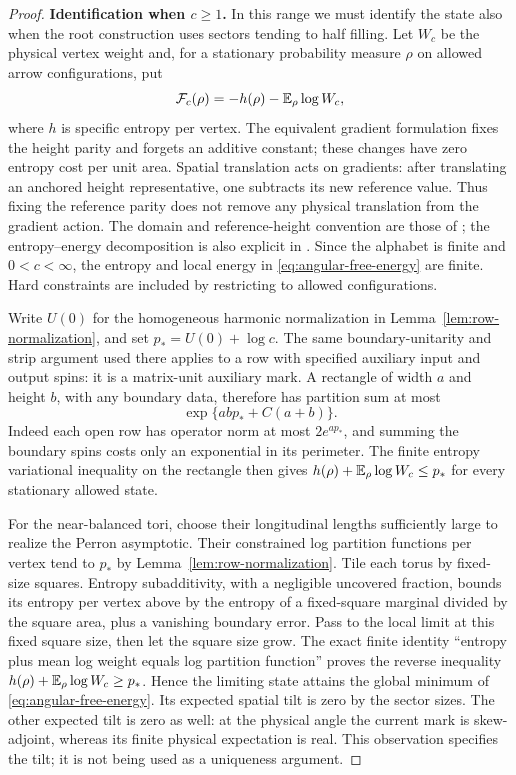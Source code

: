 \begin{proof}
\smallskip\noindent\textbf{Identification when $c\ge1$.}
In this range we must identify the state also when the root construction
uses sectors tending to half filling.  Let $W_c$ be the physical vertex
weight and, for a stationary probability measure $\rho$ on allowed
arrow configurations, put
\begin{equation}\label{eq:angular-free-energy}
 \mathcal F_c(\rho)=-h(\rho)-\mathbb E_\rho\log W_c,
\end{equation}
where $h$ is specific entropy per vertex.  The equivalent gradient
formulation fixes the height parity and forgets an additive constant;
these changes have zero entropy cost per unit area.  Spatial translation
acts on gradients: after translating an anchored height representative,
one subtracts its new reference value.  Thus fixing the reference parity
does not remove any physical translation from the gradient action.
The domain and reference-height convention are those of
\cite[Section 2.3 and Appendix B]{Sheffield2005}; the entropy--energy
decomposition is also explicit in
\cite[Sections 2.3.2--2.3.4]{LammersTassy2024}.
Since the alphabet
is finite and $0<c<\infty$, the entropy and local energy in
\eqref{eq:angular-free-energy} are finite.  Hard constraints are included
by restricting to allowed configurations.

Write $U(0)$ for the homogeneous harmonic normalization in
Lemma~\ref{lem:row-normalization}, and set
$p_*=U(0)+\log c$.  The same boundary-unitarity and strip argument used
there applies to a row with specified auxiliary input and output spins:
it is a matrix-unit auxiliary mark.  A rectangle of width $a$ and
height $b$, with any boundary data, therefore has partition sum at most
\[
 \exp\{abp_*+C(a+b)\}.
\]
Indeed each open row has operator norm at most $2e^{ap_*}$, and
summing the boundary spins costs only an exponential in its perimeter.
The finite entropy variational inequality on the rectangle then gives
$h(\rho)+\mathbb E_\rho\log W_c\le p_*$ for every stationary allowed state.

For the near-balanced tori, choose their longitudinal lengths sufficiently
large to realize the Perron asymptotic.  Their constrained log partition
functions per vertex tend to $p_*$ by
Lemma~\ref{lem:row-normalization}.  Tile each torus by fixed-size squares.
Entropy subadditivity, with a negligible uncovered fraction, bounds its
entropy per vertex above by the entropy of a fixed-square marginal
divided by the square area, plus a vanishing boundary error.  Pass to the
local limit at this fixed square size, then let the square size grow.
The exact finite identity ``entropy plus mean log weight equals log
partition function'' proves the reverse inequality
$h(\rho)+\mathbb E_\rho\log W_c\ge p_*$.  Hence the limiting state attains
the global minimum of \eqref{eq:angular-free-energy}.  Its expected
spatial tilt is zero by the sector sizes.  The other expected tilt is
zero as well: at the physical angle the current mark is skew-adjoint,
whereas its finite physical expectation is real.  This observation
specifies the tilt; it is not being used as a uniqueness argument.


\end{proof}
